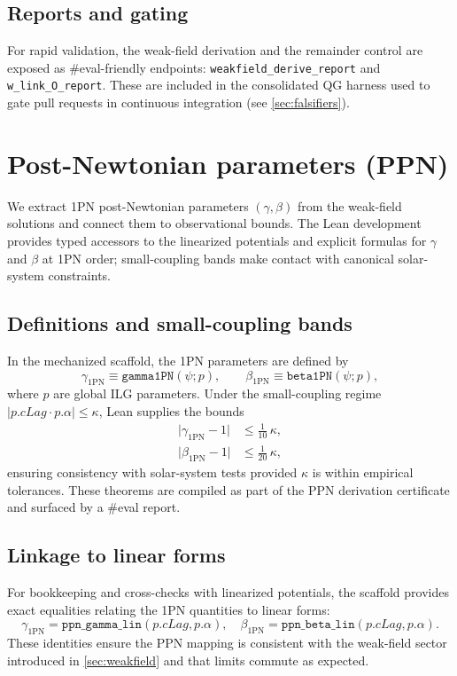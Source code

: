 \documentclass[aps,prd,twocolumn,superscriptaddress,nofootinbib,floatfix,longbibliography]{revtex4-2}
\newcommand{\lean}[1]{\texttt{#1}}
\begin{document}
\subsection{Reports and gating}
For rapid validation, the weak-field derivation and the remainder control are exposed as \#eval-friendly endpoints: \lean{weakfield_derive_report} and \lean{w_link_O_report}. These are included in the consolidated QG harness used to gate pull requests in continuous integration (see \cref{sec:falsifiers}).

\section{Post-Newtonian parameters (PPN)}\label{sec:ppn}

We extract 1PN post-Newtonian parameters $(\gamma,\beta)$ from the weak-field solutions and connect them to observational bounds. The Lean development provides typed accessors to the linearized potentials and explicit formulas for $\gamma$ and $\beta$ at 1PN order; small-coupling bands make contact with canonical solar-system constraints.

\subsection{Definitions and small-coupling bands}
In the mechanized scaffold, the 1PN parameters are defined by
\begin{equation}
  \gamma_{\mathrm{1PN}} \equiv \texttt{gamma1PN}(\psi; p), \qquad
  \beta_{\mathrm{1PN}} \equiv \texttt{beta1PN}(\psi; p),
\end{equation}
where $p$ are global ILG parameters. Under the small-coupling regime $\lvert p.cLag \cdot p.\alpha\rvert \le \kappa$, Lean supplies the bounds
\begin{align}
  \bigl\lvert \gamma_{\mathrm{1PN}} - 1 \bigr\rvert &\le \tfrac{1}{10}\,\kappa, \\
  \bigl\lvert \beta_{\mathrm{1PN}} - 1 \bigr\rvert &\le \tfrac{1}{20}\,\kappa,
\end{align}
ensuring consistency with solar-system tests provided $\kappa$ is within empirical tolerances. These theorems are compiled as part of the PPN derivation certificate and surfaced by a \#eval report.

\subsection{Linkage to linear forms}
For bookkeeping and cross-checks with linearized potentials, the scaffold provides exact equalities relating the 1PN quantities to linear forms:
\begin{equation}
  \gamma_{\mathrm{1PN}} = \texttt{ppn\_gamma\_lin}(p.cLag, p.\alpha), \quad
  \beta_{\mathrm{1PN}}  = \texttt{ppn\_beta\_lin}(p.cLag, p.\alpha).
\end{equation}
These identities ensure the PPN mapping is consistent with the weak-field sector introduced in \cref{sec:weakfield} and that limits commute as expected.
\end{document}
